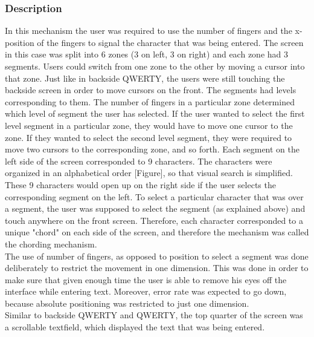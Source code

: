 \subsubsection{Description}
In this mechanism the user was required to use the number of fingers and the x-position of the fingers to signal the character that was being entered. The screen in this case was split into 6 zones (3 on left, 3 on right) and each zone had 3 segments. Users could switch from one zone to the other by moving a cursor into that zone. Just like in backside QWERTY, the users were still touching the backside screen in order to move cursors on the front. The segments had levels corresponding to them. The number of fingers in a particular zone determined which level of segment the user has selected. If the user wanted to select the first level segment in a particular zone, they would have to move one cursor to the zone. If they wanted to select the second level segment, they were required to move two cursors to the corresponding zone, and so forth. Each segment on the left side of the screen corresponded to 9 characters. The characters were organized in an alphabetical order [Figure], so that visual search is simplified. These 9 characters would open up on the right side if the user selects the corresponding segment on the left. To select a particular character that was over a segment, the user was supposed to select the segment (as explained above) and touch anywhere on the front screen. Therefore, each character corresponded to a unique "chord" on each side of the screen, and therefore the mechanism was called the chording mechanism.\\ The use of number of fingers, as opposed to position to select a segment was done deliberately to restrict the movement in one dimension. This was done in order to make sure that given enough time the user is able to remove his eyes off the interface while entering text. Moreover, error rate was expected to go down, because absolute positioning was restricted to just one dimension.\\
Similar to backside QWERTY and QWERTY, the top quarter of the screen was a scrollable textfield, which displayed the text that was being entered.\\
